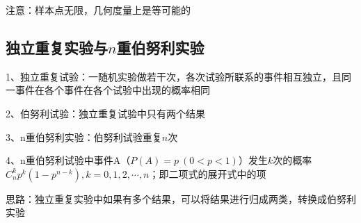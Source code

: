 注意：样本点无限，几何度量上是等可能的



\subsection{独立重复实验与$n$重伯努利实验}

1、独立重复试验：一随机实验做若干次，各次试验所联系的事件相互独立，且同一事件在各个事件在各个试验中出现的概率相同

2、伯努利试验：独立重复试验中只有两个结果

3、n重伯努利实验：伯努利试验重复$n$次

4、n重伯努利试验中事件A（$P(A) = p \ (0<p<1)$）发生$k$次的概率$C_n^kp^k(1-p^{n-k}),k=0,1,2,\cdots ,n$；即二项式的展开式中的项

思路：独立重复实验中如果有多个结果，可以将结果进行归成两类，转换成伯努利实验



